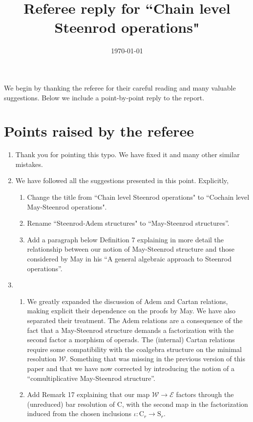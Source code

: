 \documentclass{article}
\begin{document}
	\title{Referee reply for ``Chain level Steenrod operations"}
	\date{\today}
	\maketitle
	
	We begin by thanking the referee for their careful reading and many valuable suggestions.
	Below we include a point-by-point reply to the report.
	
	\section{Points raised by the referee}

	\begin{enumerate}
		\item Thank you for pointing this typo.
		We have fixed it and many other similar mistakes.
		\item We have followed all the suggestions presented in this point.
		Explicitly,
		\begin{enumerate}
			\item Change the title from ``Chain level Steenrod operations" to ``Cochain level May-Steenrod operations".
			\item Rename ``Steenrod-Adem structures" to ``May-Steenrod structures''.
			\item Add a paragraph below Definition 7 explaining in more detail the relationship between our notion of May-Steenrod structure and those considered by May in his ``A general algebraic approach to Steenrod operations''.
		\end{enumerate}
		\item
		\begin{enumerate}
			\item We greatly expanded the discussion of Adem and Cartan relations, making explicit their dependence on the proofs by May.
			We have also separated their treatment.
			The Adem relations are a consequence of the fact that a May-Steenrod structure demands a factorization with the second factor a morphism of operads.
			The (internal) Cartan relations require some compatibility with the coalgebra structure on the minimal resolution $\mathcal W$.
			Something that was missing in the previous version of this paper and that we have now corrected by introducing the notion of a ``comultiplicative May-Steenrod structure''.
			\item Add Remark 17 explaining that our map $\mathcal W \to \mathcal E$ factors through the (unreduced) bar resolution of $\mathrm C$, with the second map in the factorization induced from the chosen inclusions $\iota \colon \mathrm C_r \to \mathrm S_r$.
		\end{enumerate}
	\end{enumerate}
\end{document}
